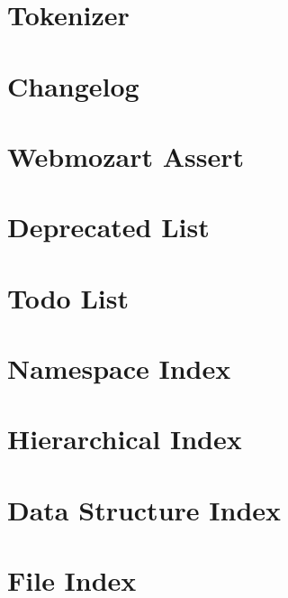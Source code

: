 \documentclass[twoside]{book}
\newcommand{\+}{\discretionary{\mbox{\scriptsize$\hookleftarrow$}}{}{}}
\begin{document}
\chapter{Tokenizer}
\label{md__c__workspace__proyecto__p_h_p_project_vendor_theseer_tokenizer__r_e_a_d_m_e}

\chapter{Changelog}
\label{md__c__workspace__proyecto__p_h_p_project_vendor_webmozart_assert__c_h_a_n_g_e_l_o_g}

\chapter{Webmozart Assert}
\label{md__c__workspace__proyecto__p_h_p_project_vendor_webmozart_assert__r_e_a_d_m_e}

\chapter{Deprecated List}
\label{deprecated}

\chapter{Todo List}
\label{todo}

\chapter{Namespace Index}

\chapter{Hierarchical Index}

\chapter{Data Structure Index}

\chapter{File Index}

\end{document}
